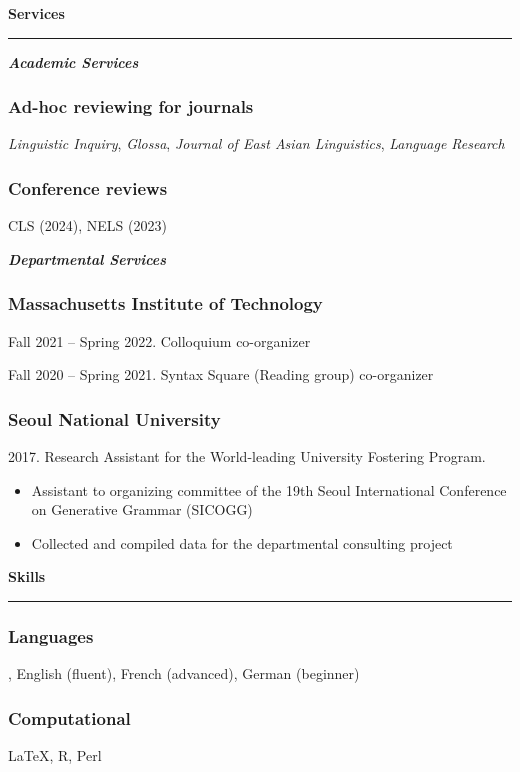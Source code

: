 \documentclass[10pt]{article}
\newcommand{\sect}[1]{\vspace{5mm} {\fontsize{14}{21}\selectfont \textbf{#1}} {\vspace{0.1cm}} \hrule {\vspace{0.3cm}}}
\newcommand{\subsect}[1]{\vspace{3mm} {\fontsize{11}{18}\selectfont \textit{\textbf{#1}}} {\vspace{0.3cm}}}
\begin{document}
\sect{Services}

\subsect{Academic Services}

\vspace{-0.75cm}

\subsubsection*{Ad-hoc reviewing for journals}

 {\textit{Linguistic Inquiry}}, {\textit{Glossa}}, {\textit{Journal of East Asian Linguistics}}, {\textit{Language Research}}

\subsubsection*{Conference reviews}

CLS (2024), NELS (2023)

\vspace{\baselineskip}

\subsect{Departmental Services}

\vspace{-0.75cm}

\subsubsection*{Massachusetts Institute of Technology}
Fall 2021 -- Spring 2022. Colloquium co-organizer

Fall 2020 -- Spring 2021. Syntax Square (Reading group) co-organizer

\subsubsection*{Seoul National University}
{2017. Research Assistant for the World-leading University Fostering Program.

\begin{itemize}[leftmargin=15pt, topsep=0pt, itemsep=0pt, parsep=0pt]
	\item{{\small Assistant to organizing committee of the 19th Seoul International Conference on Generative Grammar (SICOGG)}}
	\item{{\small Collected and compiled data for the departmental consulting project}}
\end{itemize}
}

\sect{Skills}

\subsubsection*{Languages}
, English (fluent), French (advanced), German (beginner)
\subsubsection*{Computational}
 {\LaTeX}, R, Perl
\end{document}
